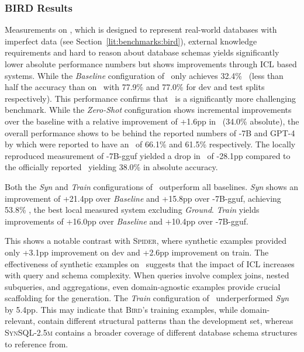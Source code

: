 \subsubsection{BIRD Results}

Measurements on \Bird, which is designed to represent real-world databases with
imperfect data (see Section~\ref{lit:benchmarks:bird}), external knowledge
requirements and hard to reason about database schemas yields significantly
lower absolute performance numbers but shows improvements through ICL based
systems. While the \textit{Baseline} configuration of \Natural~only achieves
32.4\% \EA~(less than half the accuracy than on \Spider~with 77.9\% and 77.0\%
for dev and test splits respectively). This performance confirms that \Bird~is
a significantly more challenging benchmark. While the \textit{Zero-Shot}
configuration shows incremental improvements over the baseline with a relative
improvement of +1.6pp in \EA~(34.0\% absolute), the overall performance shows
to be behind the reported numbers of \OmniSQL-7B and GPT-4 by \cite{OmniSQL}
which were reported to have an \EA~of 66.1\% and 61.5\% respectively. The
locally reproduced measurement of \OmniSQL-7B-gguf yielded a drop in \EA~of
-28.1pp compared to the officially reported \EA~yielding 38.0\% in absolute
accuracy.

Both the \textit{Syn} and \textit{Train} configurations of \Natural~outperform
all baselines. \textit{Syn} shows an improvement of +21.4pp over
\textit{Baseline} and +15.8pp over \OmniSQL-7B-gguf, achieving 53.8\% \EA,
the best local measured system excluding \textit{Ground}. \textit{Train} yields
improvements of +16.0pp over \textit{Baseline} and +10.4pp over \OmniSQL-7B-gguf.

This shows a notable contrast with \textsc{Spider}, where synthetic examples
provided only +3.1pp improvement on dev and +2.6pp improvement on train.
The effectiveness of synthetic examples on \Bird~suggests that the impact of
ICL increases with query and schema complexity. When queries involve complex
joins, nested subqueries, and aggregations, even domain-agnostic examples
provide crucial scaffolding for the generation. The \textit{Train}
configuration of \Natural~underperformed \textit{Syn} by 5.4pp. This may
indicate that \textsc{Bird}'s training examples, while domain-relevant, contain
different structural patterns than the development set, whereas
\textsc{SynSQL-2.5m} contains a broader coverage of different database schema
structures to reference from.

